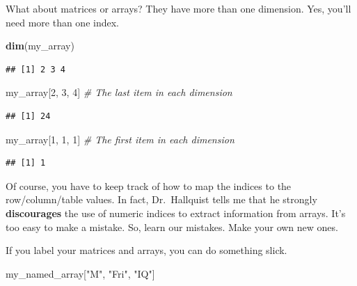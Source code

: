 \documentclass[]{article}
\newenvironment{Shaded}{\begin{snugshade}}{\end{snugshade}}
\newcommand{\KeywordTok}[1]{\textcolor[rgb]{0.13,0.29,0.53}{\textbf{#1}}}
\newcommand{\DecValTok}[1]{\textcolor[rgb]{0.00,0.00,0.81}{#1}}
\newcommand{\StringTok}[1]{\textcolor[rgb]{0.31,0.60,0.02}{#1}}
\newcommand{\CommentTok}[1]{\textcolor[rgb]{0.56,0.35,0.01}{\textit{#1}}}
\newcommand{\NormalTok}[1]{#1}
\begin{document}
What about matrices or arrays? They have more than one dimension. Yes,
you'll need more than one index.

\begin{Shaded}
\begin{Highlighting}[]
\KeywordTok{dim}\NormalTok{(my_array)}
\end{Highlighting}
\end{Shaded}

\begin{verbatim}
## [1] 2 3 4
\end{verbatim}

\begin{Shaded}
\begin{Highlighting}[]
\NormalTok{my_array[}\DecValTok{2}\NormalTok{, }\DecValTok{3}\NormalTok{, }\DecValTok{4}\NormalTok{]  }\CommentTok{# The last item in each dimension}
\end{Highlighting}
\end{Shaded}

\begin{verbatim}
## [1] 24
\end{verbatim}

\begin{Shaded}
\begin{Highlighting}[]
\NormalTok{my_array[}\DecValTok{1}\NormalTok{, }\DecValTok{1}\NormalTok{, }\DecValTok{1}\NormalTok{]  }\CommentTok{# The first item in each dimension}
\end{Highlighting}
\end{Shaded}

\begin{verbatim}
## [1] 1
\end{verbatim}

Of course, you have to keep track of how to map the indices to the
row/column/table values. In fact, Dr.~Hallquist tells me that he
strongly \textbf{discourages} the use of numeric indices to extract
information from arrays. It's too easy to make a mistake. So, learn our
mistakes. Make your own new ones.

If you label your matrices and arrays, you can do something slick.

\begin{Shaded}
\begin{Highlighting}[]
\NormalTok{my_named_array[}\StringTok{"M"}\NormalTok{, }\StringTok{"Fri"}\NormalTok{, }\StringTok{"IQ"}\NormalTok{]}
\end{Highlighting}
\end{Shaded}
\end{document}
